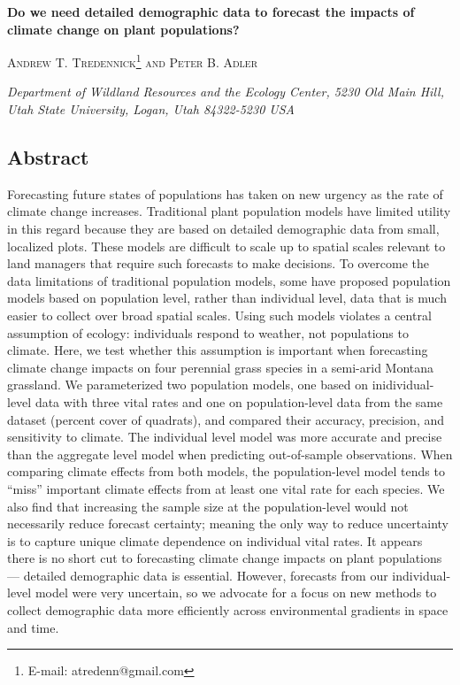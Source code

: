 \documentclass[12pt,]{article}
\author{}
\date{}
\begin{document}
\normalsize


\begin{centering}
\textbf{\large{Do we need detailed demographic data to forecast the impacts of climate change on plant populations?}}

\textsc{\small{Andrew T. Tredennick\footnote{E-mail: atredenn@gmail.com} and Peter B. Adler}}

\textit{\small{Department of Wildland Resources and the Ecology Center, 5230 Old Main Hill, Utah State University, Logan, Utah 84322-5230 USA}}

\end{centering}

\subsection{Abstract}\label{abstract}

Forecasting future states of populations has taken on new urgency as the
rate of climate change increases. Traditional plant population models
have limited utility in this regard because they are based on detailed
demographic data from small, localized plots. These models are difficult
to scale up to spatial scales relevant to land managers that require
such forecasts to make decisions. To overcome the data limitations of
traditional population models, some have proposed population models
based on population level, rather than individual level, data that is
much easier to collect over broad spatial scales. Using such models
violates a central assumption of ecology: individuals respond to
weather, not populations to climate. Here, we test whether this
assumption is important when forecasting climate change impacts on four
perennial grass species in a semi-arid Montana grassland. We
parameterized two population models, one based on inidividual-level data
with three vital rates and one on population-level data from the same
dataset (percent cover of quadrats), and compared their accuracy,
precision, and sensitivity to climate. The individual level model was
more accurate and precise than the aggregate level model when predicting
out-of-sample observations. When comparing climate effects from both
models, the population-level model tends to ``miss'' important climate
effects from at least one vital rate for each species. We also find that
increasing the sample size at the population-level would not necessarily
reduce forecast certainty; meaning the only way to reduce uncertainty is
to capture unique climate dependence on individual vital rates. It
appears there is no short cut to forecasting climate change impacts on
plant populations --- detailed demographic data is essential. However,
forecasts from our individual-level model were very uncertain, so we
advocate for a focus on new methods to collect demographic data more
efficiently across environmental gradients in space and time.
\end{document}
